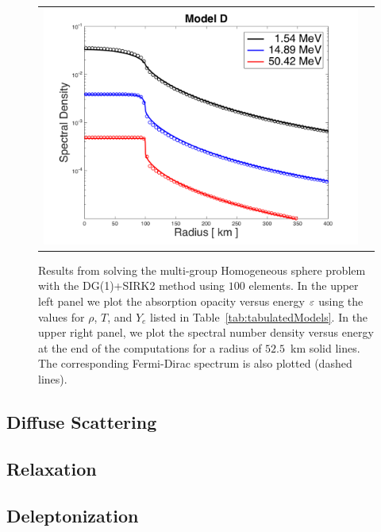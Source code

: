 \documentclass[10pt,preprint]{aastex}
\begin{document}
\begin{figure}
\begin{center}
\begin{tabular}{cc}
      \includegraphics[scale=0.4]{./Figures/HomogeneousSphere_VsRadius_D}
    \end{tabular}
  \end{center}
  \caption{Results from solving the multi-group Homogeneous sphere problem with the DG(1)+SIRK2 method using $100$ elements.
    In the upper left panel we plot the absorption opacity versus energy $\varepsilon$ using the values for $\rho$, $T$, and $Y_{e}$ listed in Table~\ref{tab:tabulatedModels}. In the upper right panel, we plot the spectral number density versus energy at the end of the computations for a radius of $52.5$~km solid lines.  The corresponding Fermi-Dirac spectrum is also plotted (dashed lines).  }
  \label{fig:homogeneousSphere1D_weaklib}
\end{figure}

\subsection{Diffuse Scattering}

\subsection{Relaxation}

\subsection{Deleptonization}
\end{document}
